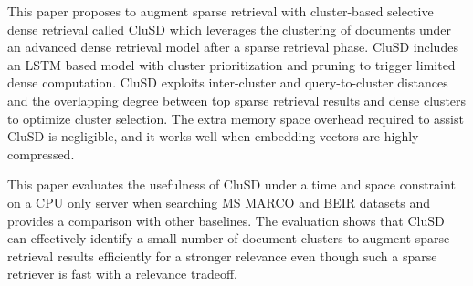 



This paper proposes  to  augment sparse retrieval with 
cluster-based selective dense retrieval called CluSD which
leverages the clustering of documents   under an advanced dense retrieval model after  a sparse retrieval phase.
CluSD includes an LSTM based model with cluster prioritization and pruning to 
trigger limited dense computation. 
CluSD exploits inter-cluster and query-to-cluster distances and   the overlapping degree between top sparse retrieval results and dense clusters
to optimize cluster selection. 
The extra memory space overhead required to assist CluSD is negligible, and it  
works well when embedding vectors are highly compressed.

This paper evaluates  the usefulness   of CluSD  under a time and space constraint on a CPU only server when
 searching MS MARCO and BEIR  datasets  and provides a comparison with other baselines.
The evaluation  shows that CluSD can effectively identify a small number of document clusters to augment sparse retrieval results efficiently 
for  a stronger relevance  even though such a  sparse retriever is fast with  a relevance tradeoff. 
 



